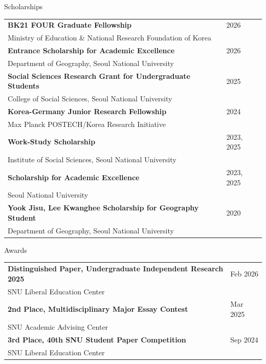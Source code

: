 \documentclass{resume} %
\begin{document}
	\begin{rSection}{Scholarships}
		\begin{tabular*}{\linewidth}{@{\extracolsep{\fill}} l l}
			\textbf{BK21 FOUR Graduate Fellowship} & 2026 \\
			Ministry of Education \& National Research Foundation of Korea & \\[2pt]
			\textbf{Entrance Scholarship for Academic Excellence} & 2026 \\
			Department of Geography, Seoul National University & \\[2pt]
			\textbf{Social Sciences Research Grant for Undergraduate Students} & 2025 \\
			College of Social Sciences, Seoul National University & \\[2pt]
			\textbf{Korea-Germany Junior Research Fellowship} & 2024 \\
			Max Planck POSTECH/Korea Research Initiative & \\[2pt]
			\textbf{Work-Study Scholarship} & 2023, 2025 \\
			Institute of Social Sciences, Seoul National University & \\[2pt]
			\textbf{Scholarship for Academic Excellence} & 2023, 2025 \\
			Seoul National University & \\[2pt]
			\textbf{Yook Jisu, Lee Kwanghee Scholarship for Geography Student} & 2020 \\
			Department of Geography, Seoul National University & \\
		\end{tabular*}
	\end{rSection}
	\begin{rSection}{Awards}
		\begin{tabular*}{\linewidth}{@{\extracolsep{\fill}} l l}
			\textbf{Distinguished Paper, Undergraduate Independent Research 2025} & Feb 2026 \\
			SNU Liberal Education Center & \\[2pt]
			\textbf{2nd Place, Multidisciplinary Major Essay Contest} & Mar 2025 \\
			SNU Academic Advising Center & \\[2pt]
			\textbf{3rd Place, 40th SNU Student Paper Competition} & Sep 2024 \\
			SNU Liberal Education Center & \\
		\end{tabular*}
	\end{rSection}
\end{document}
